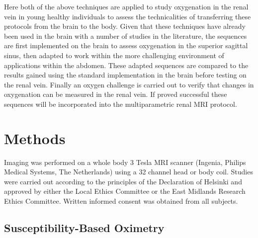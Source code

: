 Here both of the above techniques are applied to study oxygenation in the renal vein in young healthy individuals to assess the technicalities of transferring these protocols from the brain to the body. Given that these techniques have already been used in the brain with a number of studies in the literature, the sequences are first implemented on the brain to assess oxygenation in the superior sagittal sinus, then adapted to work within the more challenging environment of applications within the abdomen. These adapted sequences are compared to the results gained using the standard implementation in the brain before testing on the renal vein. Finally an oxygen challenge is carried out to verify that changes in oxygenation can be measured in the renal vein. If proved successful these sequences will be incorporated into the multiparametric renal \ac{MRI} protocol.

\section{Methods}

Imaging was performed on a whole body 3 Tesla \ac{MRI} scanner (Ingenia, Philips Medical Systems, The Netherlands) using a 32 channel head or body coil. Studies were carried out according to the principles of the Declaration of Helsinki and approved by either the Local Ethics Committee or the East Midlands Research Ethics Committee. Written informed consent was obtained from all subjects.

\subsection{Susceptibility-Based Oximetry}
\label{sec:SBO}
